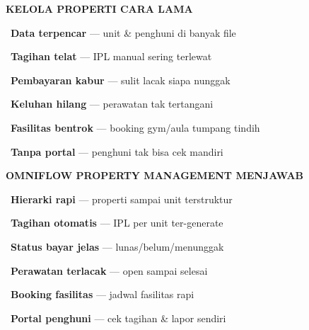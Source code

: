 \documentclass[a4paper]{article}
\begin{document}
\noindent
\begin{minipage}[t]{0.485\textwidth}
    \colorbox{RedLight}{%
        \begin{minipage}{\dimexpr\textwidth-2\fboxsep\relax}
            {\fontsize{10}{13}\selectfont\bfseries\color{RedText} KELOLA PROPERTI CARA LAMA}
        \end{minipage}}\par
    \vspace{4pt}

    {\fontsize{9.5}{13}\selectfont\color{TextDark}%
    \textbullet\ \textbf{Data terpencar} --- unit \& penghuni di banyak file\par\vspace{4pt}%
    \textbullet\ \textbf{Tagihan telat} --- IPL manual sering terlewat\par\vspace{4pt}%
    \textbullet\ \textbf{Pembayaran kabur} --- sulit lacak siapa nunggak\par\vspace{4pt}%
    \textbullet\ \textbf{Keluhan hilang} --- perawatan tak tertangani\par\vspace{4pt}%
    \textbullet\ \textbf{Fasilitas bentrok} --- booking gym/aula tumpang tindih\par\vspace{4pt}%
    \textbullet\ \textbf{Tanpa portal} --- penghuni tak bisa cek mandiri}%
\end{minipage}%
\hfill%
\begin{minipage}[t]{0.485\textwidth}
    \colorbox{BluePrimary}{%
        \begin{minipage}{\dimexpr\textwidth-2\fboxsep\relax}
            {\fontsize{10}{13}\selectfont\bfseries\color{White} OMNIFLOW PROPERTY MANAGEMENT MENJAWAB}
        \end{minipage}}\par
    \vspace{4pt}

    {\fontsize{9.5}{13}\selectfont\color{TextDark}%
    \textbullet\ \textbf{Hierarki rapi} --- properti sampai unit terstruktur\par\vspace{4pt}%
    \textbullet\ \textbf{Tagihan otomatis} --- IPL per unit ter-generate\par\vspace{4pt}%
    \textbullet\ \textbf{Status bayar jelas} --- lunas/belum/menunggak\par\vspace{4pt}%
    \textbullet\ \textbf{Perawatan terlacak} --- open sampai selesai\par\vspace{4pt}%
    \textbullet\ \textbf{Booking fasilitas} --- jadwal fasilitas rapi\par\vspace{4pt}%
    \textbullet\ \textbf{Portal penghuni} --- cek tagihan \& lapor sendiri}%
\end{minipage}
\end{document}
